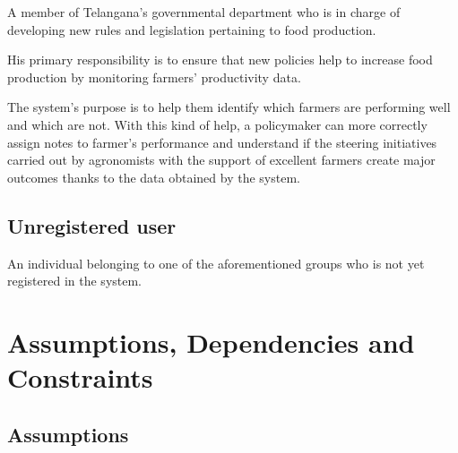 A member of Telangana's governmental department who is in charge of developing new rules and legislation pertaining to food production.

His primary responsibility is to ensure that new policies help to increase food production by monitoring farmers' productivity data.

The system's purpose is to help them identify which farmers are performing well and which are not. With this kind of help, a policymaker can more correctly assign notes to farmer's performance and understand if the steering initiatives carried out by agronomists with the support of excellent farmers create major outcomes thanks to the data obtained by the system.

\subsection{Unregistered user}

An individual belonging to one of the aforementioned groups who is not yet registered in the system.

\section{Assumptions, Dependencies and Constraints}

\subsection{Assumptions}

